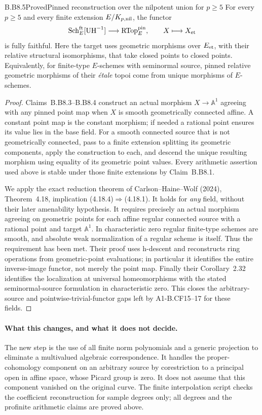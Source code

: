 \begin{claim}{B.B8.5}{Proved}{Pinned reconstruction over the nilpotent union for $p\geq5$}
For every $p\geq5$ and every finite extension $E/K_{p,\rm nil}$,
the functor
\[
 \operatorname{Sch}^{\rm ft}_E[\operatorname{UH}^{-1}]
       \longrightarrow\operatorname{RTop}^{\rm pin}_E,
 \qquad X\longmapsto X_{\rm et}
\]
is fully faithful.  Here the target uses geometric morphisms over
$E_{\rm et}$, with their relative structural isomorphisms, that
take closed points to closed points.  Equivalently, for finite-type
$E$-schemes with seminormal source, pinned relative geometric
morphisms of their \emph{\'etale} topoi come from unique morphisms
of $E$-schemes.
\end{claim}
\begin{proof}
Claims~B.B8.3--B.B8.4 construct an actual morphism
$X\to\mathbb A^1$ agreeing with any pinned point map when $X$
is smooth geometrically connected affine.  A constant point map is
the constant morphism; if needed a rational point ensures its value
lies in the base field.  For a smooth connected source that is not
geometrically connected, pass to a finite extension splitting its
geometric components, apply the construction to each, and descend
the unique resulting morphism using equality of its geometric
point values.  Every arithmetic assertion used above is stable
under those finite extensions by Claim~B.B8.1.

We apply the exact reduction theorem of Carlson--Haine--Wolf
(2024), Theorem~4.18, implication (4.18.4)$\Rightarrow$(4.18.1).
It holds for \emph{any} field, without their later amenability
hypothesis.  It requires precisely an actual morphism agreeing on
geometric points for each affine regular connected source with a
rational point and target $\mathbb A^1$.  In characteristic zero
regular finite-type schemes are smooth, and absolute weak
normalization of a regular scheme is itself.  Thus the requirement
has been met.  Their proof uses h-descent and reconstructs ring
operations from geometric-point evaluations; in particular it
identifies the entire inverse-image functor, not merely the point
map.  Finally their Corollary~2.32 identifies the localization at
universal homeomorphisms with the stated seminormal-source
formulation in characteristic zero.  This closes the
arbitrary-source and pointwise-trivial-functor gaps left by
A1-B.CF15--17 for these fields.
\end{proof}

\paragraph{What this changes, and what it does not decide.}
The new step is the use of all finite norm polynomials and a generic
projection to eliminate a multivalued algebraic correspondence.
It handles the proper-cohomology component on an arbitrary source
by corestriction to a principal open in affine space, whose Picard
group is zero.  It does not assume that this component vanished
on the original curve.  The finite interpolation script checks
the coefficient reconstruction for sample degrees only; all
degrees and the profinite arithmetic claims are proved above.

